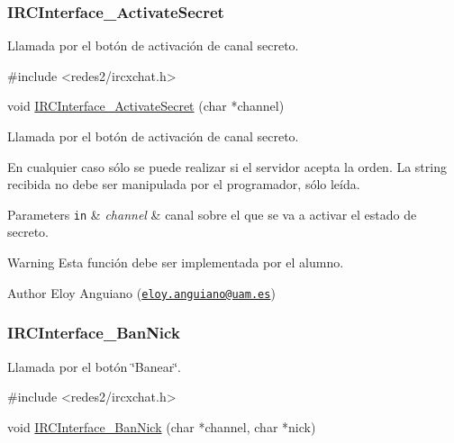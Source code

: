  \hypertarget{IRCInterface_ActivateSecret}{}\subsubsection{I\-R\-C\-Interface\-\_\-\-Activate\-Secret}\label{IRCInterface_ActivateSecret}
Llamada por el botón de activación de canal secreto.


\begin{DoxyCode}
\textcolor{preprocessor}{#include <redes2/ircxchat.h>}

\textcolor{keywordtype}{void} \hyperlink{_g-2301-05-_p2-xchat2_8c_aa9e9155115b834d85a4d10cb27f99093}{IRCInterface\_ActivateSecret} (\textcolor{keywordtype}{char} *channel)
\end{DoxyCode}


Llamada por el botón de activación de canal secreto.

En cualquier caso sólo se puede realizar si el servidor acepta la orden. La string recibida no debe ser manipulada por el programador, sólo leída.


\begin{DoxyParams}[1]{Parameters}
\mbox{\tt in}  & {\em channel} & canal sobre el que se va a activar el estado de secreto.\\
\hline
\end{DoxyParams}
\begin{DoxyWarning}{Warning}
Esta función debe ser implementada por el alumno.
\end{DoxyWarning}
\begin{DoxyAuthor}{Author}
Eloy Anguiano (\href{mailto:eloy.anguiano@uam.es}{\tt eloy.\-anguiano@uam.\-es})
\end{DoxyAuthor}


 \hypertarget{IRCInterface_BanNick}{}\subsubsection{I\-R\-C\-Interface\-\_\-\-Ban\-Nick}\label{IRCInterface_BanNick}
Llamada por el botón \char`\"{}\-Banear\char`\"{}.


\begin{DoxyCode}
\textcolor{preprocessor}{#include <redes2/ircxchat.h>}

\textcolor{keywordtype}{void} \hyperlink{_g-2301-05-_p2-xchat2_8c_a42773b5a840f9d0455f148d285e1e595}{IRCInterface\_BanNick} (\textcolor{keywordtype}{char} *channel, \textcolor{keywordtype}{char} *nick)
\end{DoxyCode}


